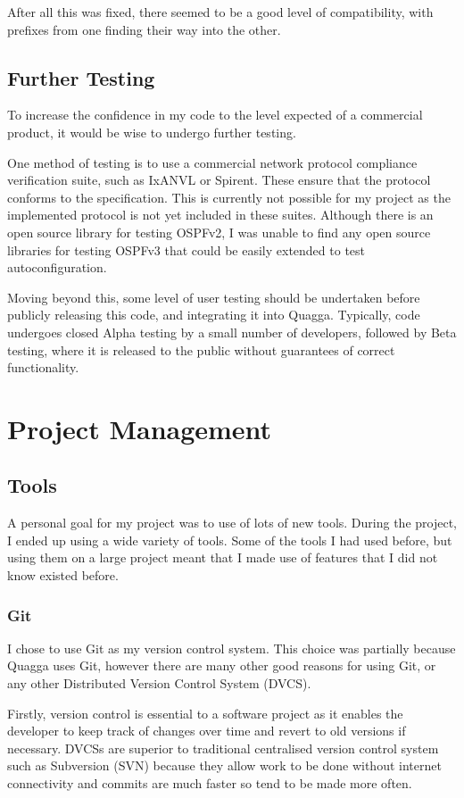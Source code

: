 \documentclass[12pt,a4paper,twoside]{report}
\begin{document}
After all this was fixed, there seemed to be a good level of compatibility,
with prefixes from one finding their way into the other.

\section{Further Testing}
To increase the confidence in my code to the level expected of a
commercial product, it would be wise to undergo further testing. 

One method of testing is to use a commercial network protocol compliance
verification suite, such as IxANVL or Spirent. These ensure that the protocol
conforms to the specification. This is currently not possible for my project as
the implemented protocol is not yet included in these suites.  Although there
is an open source library for testing OSPFv2, I was unable to find any open
source libraries for testing OSPFv3 that could be easily extended to test
autoconfiguration. 

Moving beyond this, some level of user testing should be undertaken before
publicly releasing this code, and integrating it into Quagga. Typically, code
undergoes closed Alpha testing by a small number of developers, followed by
Beta testing, where it is released to the public without guarantees of
correct functionality.

\chapter{Project Management}
\section{Tools}
A personal goal for my project was to use of lots of new tools. During the
project, I ended up using a wide variety of tools. Some of the tools I had used
before, but using them on a large project meant that I made use of features that
I did not know existed before.

\subsection{Git}
I chose to use Git as my version control system. This choice was
partially because Quagga uses Git, however there are many other good reasons for
using Git, or any other Distributed Version Control System (DVCS).

Firstly, version control is essential to a software project as it enables the
developer to keep track of changes over time and revert to old versions if
necessary. DVCSs are superior to traditional centralised version control
system such as Subversion (SVN) because they allow work to be done without internet
connectivity and commits are much faster so tend to be made more often. 
\end{document}
